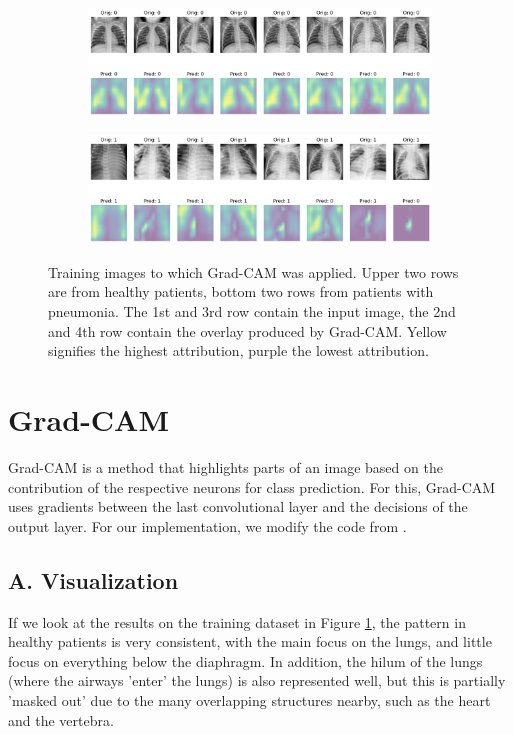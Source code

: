 \begin{figure}
    \centering
    \begin{subfigure}{\textwidth}
        \includegraphics[width=1\textwidth]{images/gc_train.png}
    \end{subfigure}
    \centering
    \begin{subfigure}{\textwidth}
        \includegraphics[width=1\textwidth]{images/gc_train_P.png}
    \end{subfigure}
    \caption{Training images to which Grad-CAM was applied. Upper two rows are from healthy patients, bottom two rows from patients with pneumonia. The 1st and 3rd row contain the input image, the 2nd and 4th row contain the overlay produced by Grad-CAM. Yellow signifies the highest attribution, purple the lowest attribution.}
    \label{fig:gc_train}
\end{figure}

\section{Grad-CAM}

Grad-CAM is a method that highlights parts of an image based on the contribution of the respective neurons for class prediction. For this, Grad-CAM uses gradients between the last convolutional layer and the decisions of the output layer.
For our implementation, we modify the code from \cite{gradcam}.

\subsection*{A. Visualization}
If we look at the results on the training dataset in Figure \ref{fig:gc_train}, the pattern in healthy patients is very consistent, with the main focus on the lungs, and little focus on everything below the diaphragm. In addition, the hilum of the lungs (where the airways 'enter' the lungs) is also represented well, but this is partially 'masked out' due to the many overlapping structures nearby, such as the heart and the vertebra.


